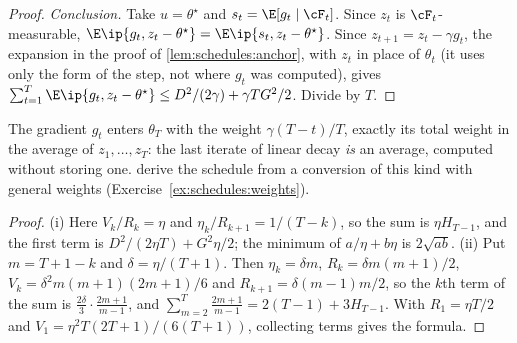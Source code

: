 \begin{refsection}
\begin{proof}
\emph{Conclusion.} Take $u=\theta^\star$ and $s_t=\E[g_t\mid\cF_t]$. Since $z_t$ is $\cF_t$-measurable, $\E\ip{g_t,z_t-\theta^\star}=\E\ip{s_t,z_t-\theta^\star}$. Since $z_{t+1}=z_t-\gamma g_t$, the expansion in the proof of \cref{lem:schedules:anchor}, with $z_t$ in place of $\theta_t$ (it uses only the form of the step, not where $g_t$ was computed), gives $\sum_{t=1}^T\E\ip{g_t,z_t-\theta^\star}\le D^2/(2\gamma)+\gamma TG^2/2$. Divide by $T$.
\end{proof}

The gradient $g_t$ enters $\theta_T$ with the weight $\gamma(T-t)/T$, exactly its total weight in the average of $z_1,\dots,z_T$: the last iterate of linear decay \emph{is} an average, computed without storing one. \Textcite{DefazioEtAl2023} derive the schedule from a conversion of this kind with general weights (Exercise~\ref{ex:schedules:weights}).


\begin{proof}
(i) Here $V_k/R_k=\eta$ and $\eta_k/R_{k+1}=1/(T-k)$, so the sum is $\eta H_{T-1}$, and the first term is $D^2/(2\eta T)+G^2\eta/2$; the minimum of $a/\eta+b\eta$ is $2\sqrt{ab}$. (ii) Put $m=T+1-k$ and $\delta=\eta/(T+1)$. Then $\eta_k=\delta m$, $R_k=\delta m(m+1)/2$, $V_k=\delta^2m(m+1)(2m+1)/6$ and $R_{k+1}=\delta(m-1)m/2$, so the $k$th term of the sum is $\frac{2\delta}{3}\cdot\frac{2m+1}{m-1}$, and $\sum_{m=2}^{T}\frac{2m+1}{m-1}=2(T-1)+3H_{T-1}$. With $R_1=\eta T/2$ and $V_1=\eta^2T(2T+1)/(6(T+1))$, collecting terms gives the formula.
\end{proof}


\end{refsection}
